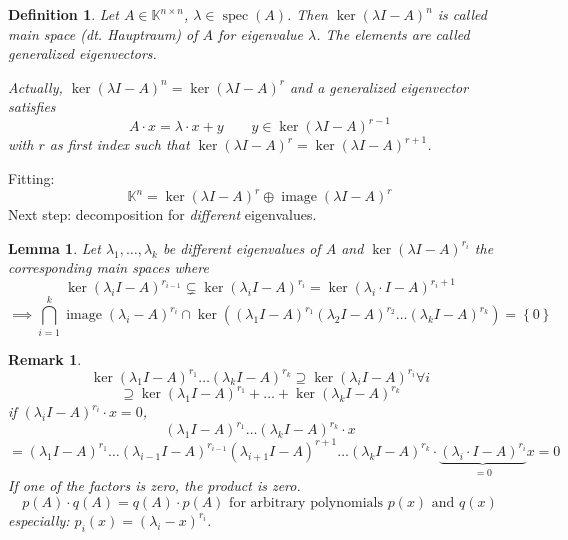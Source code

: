 \documentclass{article}
\newtheorem{definition}{Definition}  \numberwithin{definition}{section}
\newtheorem{lemma}{Lemma}  \numberwithin{lemma}{section}
\newtheorem{remark}{Remark}  \numberwithin{remark}{section}
\newcommand{\set}[1]{\left\{#1\right\}}
\DeclareMathOperator{\im}{image}
\begin{document}
\begin{definition} %
  Let $A \in \mathbb K^{n\times n}$, $\lambda \in \operatorname{spec}(A)$.
  Then $\ker(\lambda I - A)^n$ is called \emph{main space} (dt. \foreignlanguage{german}{Hauptraum})
  of $A$ for eigenvalue $\lambda$. The elements are called \emph{generalized eigenvectors}.

  Actually, $\ker(\lambda I - A)^n = \ker(\lambda I - A)^r$ and a generalized eigenvector satisfies
  \[ A \cdot x = \lambda \cdot x + y \qquad y \in \ker(\lambda I - A)^{r-1} \]
  with $r$ as first index such that $\ker(\lambda I - A)^r = \ker(\lambda I - A)^{r+1}$.
\end{definition}

Fitting:
\[ \mathbb K^n = \ker(\lambda I - A)^r \oplus \im(\lambda I - A)^r \]
Next step: decomposition for \emph{different} eigenvalues.

\begin{lemma} %
  \label{lemma1111}
  Let $\lambda_1, \dots, \lambda_k$ be different eigenvalues of $A$ and
  $\ker(\lambda I - A)^{r_i}$ the corresponding main spaces where
  \[ \ker(\lambda_i I - A)^{r_{i-1}} \subsetneq \ker(\lambda_i I - A)^{r_i} = \ker(\lambda_i \cdot I - A)^{r_i + 1} \]
  \[ \implies \bigcap_{i=1}^k \im(\lambda_i - A)^{r_i} \cap \ker((\lambda_1 I - A)^{r_1} (\lambda_2 I - A)^{r_2} \dots (\lambda_k I - A)^{r_k}) = \set{0} \]
\end{lemma}

\begin{remark}
  \[ \ker(\lambda_1 I - A)^{r_1} \dots (\lambda_k I - A)^{r_k} \supseteq \ker(\lambda_i I - A)^{r_i} \forall i \]
  \[ \supseteq \ker(\lambda_1 I - A)^{r_1} + \dots + \ker(\lambda_k I - A)^{r_k} \]
  if $(\lambda_i I - A)^{r_i} \cdot x = 0$,
  \[ (\lambda_1 I - A)^{r_1} \dots (\lambda_k I - A)^{r_k} \cdot x \]
  \[ = (\lambda_1 I - A)^{r_1} \dots (\lambda_{i-1} I - A)^{r_{i-1}} (\lambda_{i+1} I - A)^{r+1} \dots (\lambda_k I - A)^{r_k} \cdot \underbrace{(\lambda_i \cdot I - A)^{r_i}}_{=0} x = 0 \]
  If one of the factors is zero, the product is zero.
  \[ p(A) \cdot q(A) = q(A) \cdot p(A) \text{ for arbitrary polynomials } p(x) \text{ and } q(x) \]
  especially: $p_i(x) = (\lambda_i - x)^{r_i}$.
\end{remark}
\end{document}
